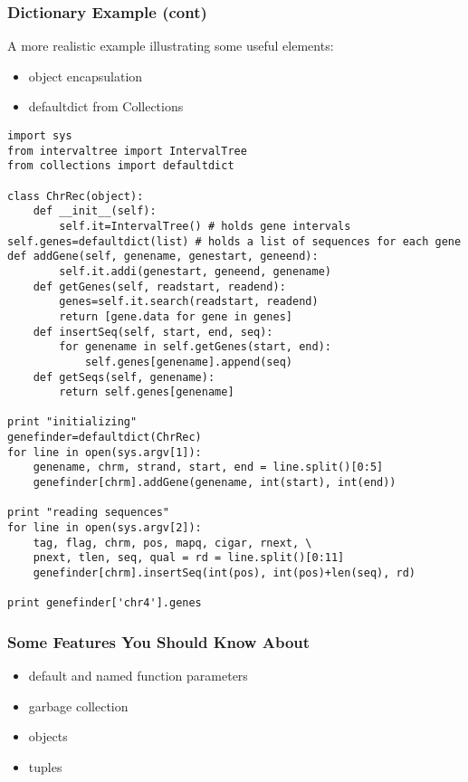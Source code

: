 \documentclass[10pt]{beamer}
\newcommand\smallfont{\fontsize{8pt}{7.2}\selectfont}
\begin{document}
\begin{frame}[fragile]
\frametitle{Dictionary Example (cont)}

A more realistic example illustrating some useful elements:
\begin{itemize}
\item object encapsulation
\item defaultdict from Collections
\end{itemize}

\smallfont
\begin{verbatim}
import sys
from intervaltree import IntervalTree
from collections import defaultdict

class ChrRec(object):
    def __init__(self):
        self.it=IntervalTree() # holds gene intervals                                                                                                                                                                       self.genes=defaultdict(list) # holds a list of sequences for each gene                                                                                                                                          def addGene(self, genename, genestart, geneend):
        self.it.addi(genestart, geneend, genename)
    def getGenes(self, readstart, readend):
        genes=self.it.search(readstart, readend)
        return [gene.data for gene in genes]
    def insertSeq(self, start, end, seq):
        for genename in self.getGenes(start, end):
            self.genes[genename].append(seq)
    def getSeqs(self, genename):
        return self.genes[genename]

print "initializing"
genefinder=defaultdict(ChrRec)
for line in open(sys.argv[1]):
    genename, chrm, strand, start, end = line.split()[0:5]
    genefinder[chrm].addGene(genename, int(start), int(end))

print "reading sequences"
for line in open(sys.argv[2]):
    tag, flag, chrm, pos, mapq, cigar, rnext, \
    pnext, tlen, seq, qual = rd = line.split()[0:11]
    genefinder[chrm].insertSeq(int(pos), int(pos)+len(seq), rd)

print genefinder['chr4'].genes

\end{verbatim}
\end{frame}


\begin{frame}[fragile]
\frametitle{Some Features You Should Know About}

\begin{itemize}
\item default and named function parameters
\item garbage collection
\item objects
\item tuples
\end{itemize}

\end{frame}
\end{document}
